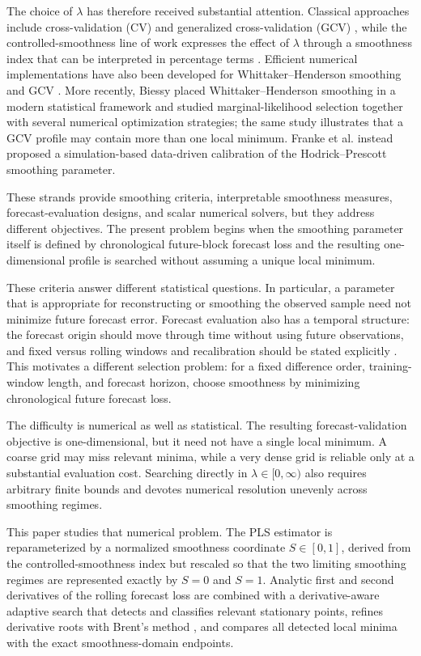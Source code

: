 \documentclass[english]{smcca}
\begin{document}
The choice of \(\lambda\) has therefore received substantial attention. Classical approaches include cross-validation (CV) and generalized cross-validation (GCV) \cite{craven1979gcv}, while the controlled-smoothness line of work expresses the effect of \(\lambda\) through a smoothness index that can be interpreted in percentage terms \cite{guerrero2008smoothness,cortes2017smoothness}. Efficient numerical implementations have also been developed for Whittaker--Henderson smoothing and GCV \cite{weinert2007wh}. More recently, Biessy \cite{biessy2026wh} placed Whittaker--Henderson smoothing in a modern statistical framework and studied marginal-likelihood selection together with several numerical optimization strategies; the same study illustrates that a GCV profile may contain more than one local minimum. Franke et al. \cite{franke2026hp} instead proposed a simulation-based data-driven calibration of the Hodrick--Prescott smoothing parameter.

These strands provide smoothing criteria, interpretable smoothness measures, forecast-evaluation designs, and scalar numerical solvers, but they address different objectives. The present problem begins when the smoothing parameter itself is defined by chronological future-block forecast loss and the resulting one-dimensional profile is searched without assuming a unique local minimum.

These criteria answer different statistical questions. In particular, a parameter that is appropriate for reconstructing or smoothing the observed sample need not minimize future forecast error. Forecast evaluation also has a temporal structure: the forecast origin should move through time without using future observations, and fixed versus rolling windows and recalibration should be stated explicitly \cite{tashman2000oos,bergmeir2012cv}. This motivates a different selection problem: for a fixed difference order, training-window length, and forecast horizon, choose smoothness by minimizing chronological future forecast loss.

The difficulty is numerical as well as statistical. The resulting forecast-validation objective is one-dimensional, but it need not have a single local minimum. A coarse grid may miss relevant minima, while a very dense grid is reliable only at a substantial evaluation cost. Searching directly in \(\lambda\in[0,\infty)\) also requires arbitrary finite bounds and devotes numerical resolution unevenly across smoothing regimes.

This paper studies that numerical problem. The PLS estimator is reparameterized by a normalized smoothness coordinate \(S\in[0,1]\), derived from the controlled-smoothness index but rescaled so that the two limiting smoothing regimes are represented exactly by \(S=0\) and \(S=1\). Analytic first and second derivatives of the rolling forecast loss are combined with a derivative-aware adaptive search that detects and classifies relevant stationary points, refines derivative roots with Brent's method \cite{brent1971zero}, and compares all detected local minima with the exact smoothness-domain endpoints.
\end{document}
